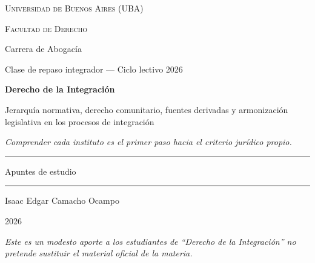 \documentclass[12pt,oneside]{book}
\newcommand{\universidad}{Universidad de Buenos Aires (UBA)}
\newcommand{\facultad}{Facultad de Derecho}
\newcommand{\carrera}{Carrera de Abogacía}
\newcommand{\materia}{Derecho de la Integración}
\newcommand{\claseinfo}{Clase de repaso integrador --- Ciclo lectivo 2026}
\newcommand{\titulo}{Jerarquía normativa, derecho comunitario, fuentes derivadas y armonización legislativa en los procesos de integración}
\newcommand{\autor}{Isaac Edgar Camacho Ocampo}
\newcommand{\anio}{2026}
\begin{document}
\begin{titlepage}
\thispagestyle{empty}

\begin{center}

\vspace*{1cm}

{\large \textsc{\universidad}}

\vspace{0.2cm}

{\large \textsc{\facultad}}

\vspace{0.2cm}

{\large \carrera}

\vspace{0.3cm}

{\normalsize \claseinfo}

\vspace{2.5cm}

{\Huge \textbf{\materia}}

\vspace{1cm}

{\LARGE \titulo}

\vspace{0.8cm}

\textit{Comprender cada instituto es el primer paso hacia el criterio jurídico propio.}

\vspace{1.2cm}

\rule{0.70\textwidth}{0.5pt}

\vspace{0.5cm}

{\large Apuntes de estudio}

\vspace{0.5cm}

\rule{0.70\textwidth}{0.5pt}

\vfill

{\large \autor}

\vspace{0.3cm}

{\large \anio}

\end{center}

\vfill

\begin{flushleft}
\textit{Este es un modesto aporte a los estudiantes de ``Derecho de la Integración'' no pretende sustituir el material oficial de la materia.}
\end{flushleft}

\end{titlepage}
\end{document}
